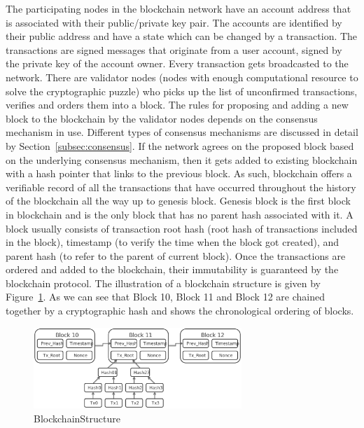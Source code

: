 The participating nodes in the blockchain network have an account address that
is associated with their public/private key pair. The accounts are identified
by their public address and have a state which can be changed by a transaction.
The transactions are signed messages that originate from a user account, signed
by the private key of the account owner. Every transaction gets broadcasted to
the network. There are validator nodes (nodes with enough computational
resource to solve the cryptographic puzzle) who picks up the list of
unconfirmed transactions, verifies and orders them into a block. The rules for
proposing and adding a new block to the blockchain by the validator nodes
depends on the consensus mechanism in use. Different types of consensus
mechanisms are discussed in detail by Section~\ref{subsec:consensus}. If the
network agrees on the proposed block based on the underlying consensus
mechanism, then it gets added to existing blockchain with a hash pointer that
links to the previous block. As such, blockchain offers a verifiable record of
all the transactions that have occurred throughout the history of the
blockchain all the way up to genesis block. Genesis block is the first block in
blockchain and is the only block that has no parent hash associated with it. A
block usually consists of transaction root hash (root hash of transactions
included in the block), timestamp (to verify the time when the block got
created), and parent hash (to refer to the parent of current block). Once the
transactions are ordered and added to the blockchain, their immutability is
guaranteed by the blockchain protocol. The illustration of a blockchain
structure is given by Figure~\ref{BlockchainStructure}. As we can see that
Block 10, Block 11 and Block 12 are chained together by a cryptographic hash
and shows the chronological ordering of blocks.
\begin{figure}
	\centering
	\includegraphics[width=0.7\textwidth]{Images/BlockchainStructure.eps}
	\caption{BlockchainStructure}
	\label{BlockchainStructure}
\end{figure}
